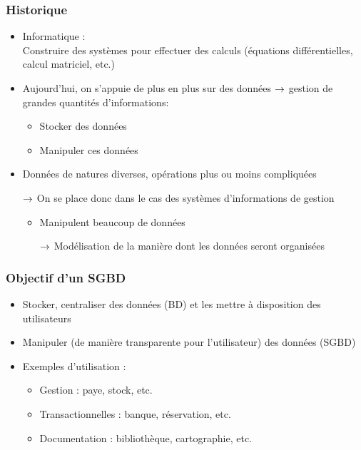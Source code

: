 \begin{frame}
  \frametitle{Historique}
  \begin{itemize}
    \item Informatique :\\
      Construire des systèmes pour effectuer des calculs (équations différentielles, calcul matriciel, etc.)
    \item Aujourd'hui, on s'appuie de plus en plus sur des données $\rightarrow$ gestion de grandes quantités d'informations:
      \begin{itemize}
        \item Stocker des données
        \item Manipuler ces données
      \end{itemize}
    \item Données de natures diverses, opérations plus ou moins compliquées
    \item[$\rightarrow$] On se place donc dans le cas des systèmes d'informations de gestion
        \begin{itemize}
            \item Manipulent beaucoup de données
            \item[$\rightarrow$] Modélisation de la manière dont les données seront
                organisées
        \end{itemize}
  \end{itemize}
\end{frame}

\begin{frame}
  \frametitle{Objectif d'un SGBD}
  \begin{itemize}
    \item Stocker, centraliser des données (BD) et les mettre à disposition des utilisateurs
    \item Manipuler (de manière transparente pour l'utilisateur) des données (SGBD)
    \item Exemples d'utilisation :
      \begin{itemize}
        \item Gestion : paye, stock, etc.
        \item Transactionnelles : banque, réservation, etc.
        \item Documentation : bibliothèque, cartographie, etc.
      \end{itemize}
  \end{itemize}
\end{frame}

